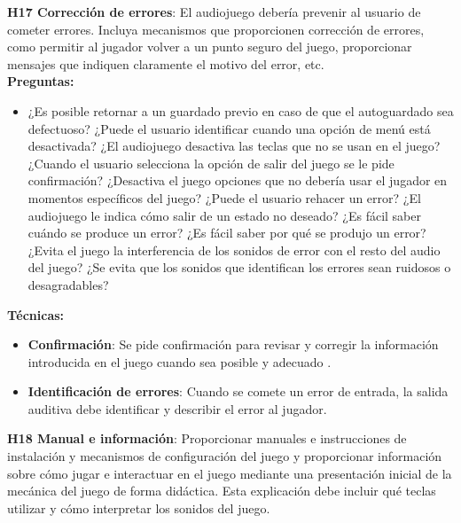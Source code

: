 \textbf{H17 Corrección de errores}:  El audiojuego debería prevenir al usuario de cometer errores. Incluya mecanismos que proporcionen corrección de errores, como permitir al jugador volver a un punto seguro del juego, proporcionar mensajes que indiquen claramente el motivo del error, etc. \cite{urbanekSoundBananasRules2018} \cite{deborbacamposUsabilityAccessibilityGameplay2016} \cite{teixeiraborgesFairPlayGuidelines2018a}\\
\textbf{Preguntas:}
\begin{itemize}
	\item  ¿Es posible retornar a un guardado previo en caso de que el autoguardado sea defectuoso? ¿Puede el usuario identificar cuando una opción de menú está desactivada? ¿El audiojuego desactiva las teclas que no se usan en el juego? ¿Cuando el usuario selecciona la opción de salir del juego se le pide confirmación? ¿Desactiva el juego opciones que no debería usar el jugador en momentos específicos del juego? ¿Puede el usuario rehacer un error? ¿El audiojuego le indica cómo salir de un estado no deseado? ¿Es fácil saber cuándo se produce un error? ¿Es fácil saber por qué se produjo un error? ¿Evita el juego la interferencia de los sonidos de error con el resto del audio del juego? ¿Se evita que los sonidos que identifican los errores sean ruidosos o desagradables?
\end{itemize}
\textbf{Técnicas:}
\begin{itemize}
	\item \textbf{Confirmación}: Se pide confirmación para revisar y corregir la información introducida en el juego cuando sea posible y adecuado \cite{WebContentAccessibility}.
	\item \textbf{Identificación de errores}: Cuando se comete un error de entrada, la salida auditiva debe identificar y describir el error al jugador. \cite{EN301549-2021}
\end{itemize}
\textbf{H18 Manual e información}: Proporcionar manuales e instrucciones de instalación y mecanismos de configuración del juego y proporcionar información sobre cómo jugar e interactuar en el juego mediante una presentación inicial de la mecánica del juego de forma didáctica. Esta explicación debe incluir qué teclas utilizar y cómo interpretar los sonidos del juego. \cite{keilSoundsEngagingInvestigating2025} \cite{araujoMobileAudioGames2017a} \cite{deborbacamposUsabilityAccessibilityGameplay2016} \cite{teixeiraborgesFairPlayGuidelines2018a} \cite{jimenezhurtadoDimensionsSubdimensionsEQUIT2025}\\
